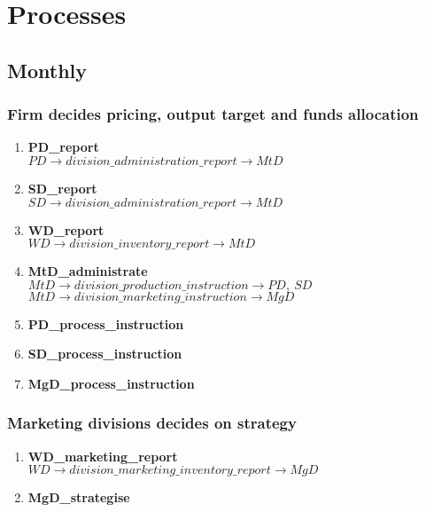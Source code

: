 \documentclass[11pt]{article}
\begin{document}
\section{Processes}

\subsection{Monthly}

\subsubsection{Firm decides pricing, output target and funds allocation}
\begin{enumerate}
	\item \textbf{PD\_report} \\
	$ PD \rightarrow division\_administration\_report \rightarrow MtD $
	\item \textbf{SD\_report} \\
	$ SD \rightarrow division\_administration\_report \rightarrow MtD $
	\item \textbf{WD\_report} \\
	$ WD \rightarrow division\_inventory\_report \rightarrow MtD $
	\item \textbf{MtD\_administrate} \\
	$ MtD \rightarrow division\_production\_instruction \rightarrow PD,\ SD $ \\
	$ MtD \rightarrow division\_marketing\_instruction \rightarrow MgD $
	\item \textbf{PD\_process\_instruction}
	\item \textbf{SD\_process\_instruction}
	\item \textbf{MgD\_process\_instruction}
\end{enumerate}

\subsubsection{Marketing divisions decides on strategy}
\begin{enumerate}
	\item \textbf{WD\_marketing\_report} \\
	$ WD \rightarrow division\_marketing\_inventory\_report \rightarrow MgD $
	\item \textbf{MgD\_strategise}
\end{enumerate}
\end{document}
